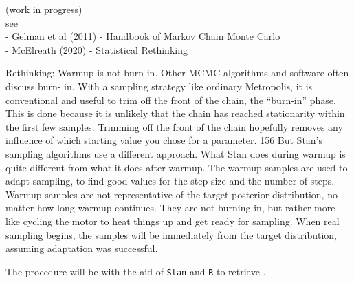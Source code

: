 {\color{red} (work in progress) \\
see \\
- Gelman et al (2011) - Handbook of Markov Chain Monte Carlo\\
- McElreath (2020) - Statistical Rethinking

Rethinking: Warmup is not burn-in. Other MCMC algorithms and software often discuss burn-
in. With a sampling strategy like ordinary Metropolis, it is conventional and useful to trim off the
front of the chain, the “burn-in” phase. This is done because it is unlikely that the chain has reached
stationarity within the first few samples. Trimming off the front of the chain hopefully removes any
influence of which starting value you chose for a parameter. 156
But Stan’s sampling algorithms use a different approach. What Stan does during warmup is quite
different from what it does after warmup. The warmup samples are used to adapt sampling, to find
good values for the step size and the number of steps. Warmup samples are not representative of
the target posterior distribution, no matter how long warmup continues. They are not burning in,
but rather more like cycling the motor to heat things up and get ready for sampling. When real
sampling begins, the samples will be immediately from the target distribution, assuming adaptation
was successful.

}


The procedure will be with the aid of \texttt{Stan} \cite{Stan2020} and \texttt{R} \cite{R2015, RStan2020} to retrieve . \\




